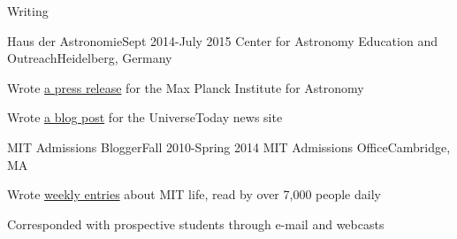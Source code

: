 \documentclass{resume} %
\begin{document}
\begin{rSection}{Writing}

  \begin{rSubsection}
    {Haus der Astronomie}{Sept 2014-July 2015}
    {Center for Astronomy Education and Outreach}{Heidelberg, Germany}
  \item Wrote \href{http://www.mpia.de/news/science/2015-03-biosignatures}
    {a press release} for the Max Planck Institute for Astronomy
  \item Wrote \href{http://www.universetoday.com/120820/distant-stellar-nurseries-this-time-in-high-definition/}
    {a blog post} for the UniverseToday news site
  \end{rSubsection}

  \begin{rSubsection}{MIT Admissions Blogger}{Fall 2010-Spring 2014}
    {MIT Admissions Office}{Cambridge, MA}
  \item Wrote \href{http://mitadmissions.org/blogs/profile/annayq}{weekly entries} about MIT life, read by over 7,000 people daily
  \item Corresponded with prospective students through e-mail and webcasts
  \end{rSubsection}

\end{rSection}
\end{document}
